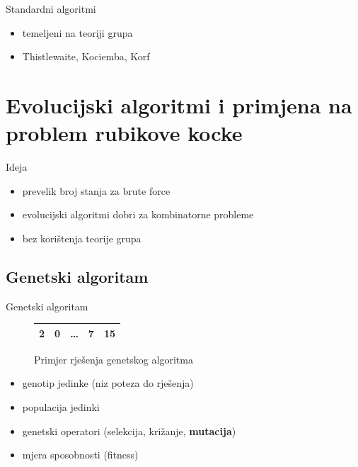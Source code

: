 \documentclass{beamer}
\begin{document}
  \begin{frame}{Standardni algoritmi}
	\begin{itemize}[<+- | alert@+>]
		\item temeljeni na teoriji grupa
		\item Thistlewaite, Kociemba, Korf
	\end{itemize}
  \end{frame}

  \section{Evolucijski algoritmi i primjena na problem rubikove kocke}

  \begin{frame}{Ideja}
	\begin{itemize}[<+- | alert@+>]
		\item prevelik broj stanja za brute force
		\item evolucijski algoritmi dobri za kombinatorne probleme
		\item bez korištenja teorije grupa
	\end{itemize}
  \end{frame} 
  
  \subsection{Genetski algoritam}
  
  \begin{frame}{Genetski algoritam}
	\begin{figure}
		\centering
		\begin{tabular}{|c|c|c|c|c|}\hline
		2 & 0 & \dots & 7 & 15\\\hline
		\end{tabular}
		\caption{Primjer rješenja genetskog algoritma}
	\end{figure}  
  
	\begin{itemize}[<+- | alert@+>]
		\item genotip jedinke (niz poteza do rješenja)
		\item populacija jedinki
		\item genetski operatori (selekcija, križanje, \textbf{mutacija})
		\item mjera sposobnosti (fitness)
	\end{itemize}
  \end{frame}    
  
\end{document}
